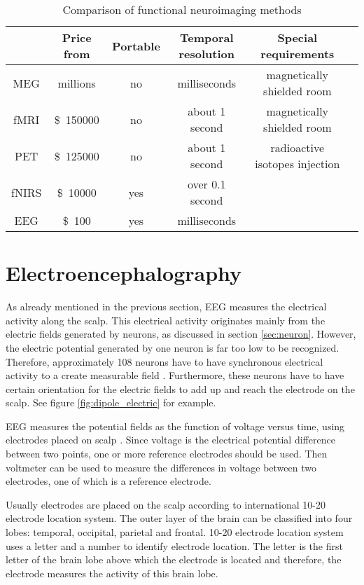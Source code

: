 \begin{table}[h]
	\centering
	\begin{tabular}{|c|c|c|c|c|c|}
	\hline
				& Price	from				& Portable	& Temporal resolution	& Special requirements		\\\hline
\gls{MEG}	& millions\pMEG				& no	& milliseconds \tresol		& magnetically shielded room\\\hline
\gls{fMRI}	& \SI{150000}[\$]\pfMRI		& no	& about 1 second \tresol	& magnetically shielded room\\\hline
\gls{PET}	& \SI{125000}[\$]\pPET		& no	& about 1 second \tresol	& radioactive isotopes injection\\\hline
\gls{fNIRS}& \SI{10000}[\$]{} \pNIRS	& yes	& over 0.1 second \pNIRS	&							\\\hline
\gls{EEG}	& \SI{100}[\$]\plEEG		& yes	& milliseconds \tresol		&							\\\hline
	\end{tabular}
	\caption{Comparison of functional neuroimaging methods}
	\label{tab:neuroimaging}
\end{table}

\section{Electroencephalography}
\label{sec:EEG}

As already mentioned in the previous section, \gls{EEG} measures the electrical activity along the scalp. This electrical activity originates mainly from the electric fields generated by neurons, as discussed in section \ref{sec:neuron}. However, the electric potential generated by one neuron is far too low to be recognized. Therefore, approximately 108 neurons have to have synchronous electrical activity to a create measurable field \cite{field_count}. Furthermore, these neurons have to have certain orientation for the electric fields to add up and reach the electrode on the scalp. See figure \ref{fig:dipole_electric} for example.

\gls{EEG} measures the potential fields as the function of voltage versus time, using electrodes placed on scalp \cite{field_count}. Since voltage is the electrical potential difference between two points, one or more reference electrodes should be used. Then voltmeter can be used to measure the differences in voltage between two electrodes, one of which is a reference electrode.

Usually electrodes are placed on the scalp according to international 10-20 electrode location system. The outer layer of the brain can be classified into four lobes: temporal, occipital, parietal and frontal. 10-20 electrode location system uses a letter and a number to identify electrode location. The letter is the first letter of the brain lobe above which the electrode is located and therefore, the electrode measures the activity of this brain lobe.

